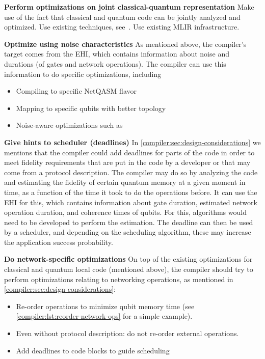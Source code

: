 \textbf{Perform optimizations on joint classical-quantum representation}
Make use of the fact that classical and quantum code can be jointly analyzed and optimized.
Use existing techniques, see~\cite{mccaskey_mlir_2021, ittah_enabling_2022, nguyen_retargetable_2022, peduri_qssa_2022}.
Use existing \ac{MLIR} infrastructure.

\textbf{Optimize using noise characteristics}
As mentioned above, the compiler's target comes from the \ac{EHI}, which contains information about noise and durations (of gates and network operations).
The compiler can use this information to do specific optimizations, including
\begin{itemize}
  \item Compiling to specific NetQASM flavor
  \item Mapping to specific qubits with better topology
  \item Noise-aware optimizations such as~\cite{smith_error_2021, murali_noise-adaptive_2019}
\end{itemize}


\textbf{Give hints to scheduler (deadlines)}
In \cref{compiler:sec:design-considerations} we mentions that the compiler could add deadlines for parts of the code in order to meet fidelity requirements that are put in the code by a developer or that may come from a protocol description.
The compiler may do so by analyzing the code and estimating the fidelity of certain quantum memory at a given moment in time, as a function of the time it took to do the operations before.
It can use the \ac{EHI} for this, which contains information about gate duration, estimated network operation duration, and coherence times of qubits.
For this, algorithms would need to be developed to perform the estimation.
The deadline can then be used by a scheduler, and depending on the scheduling algorithm, these may increase the application success probability.

\textbf{Do network-specific optimizations}
On top of the existing optimizations for classical and quantum local code (mentioned above), the compiler should try to perform optimizations relating to networking operations, as mentioned in \cref{compiler:sec:design-considerations}:
\begin{itemize}
  \item Re-order operations to minimize qubit memory time (see \cref{compiler:lst:reorder-network-ops} for a simple example).
  \item Even without protocol description: do not re-order external operations.
  \item Add deadlines to code blocks to guide scheduling
\end{itemize}

